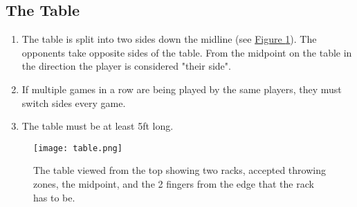 	\subsection{The Table}\label{ssec:Table}
        \begin{enumerate}[label=(\roman*)]
            \item \label{sssec:Table,sides} The table is split into two sides down the midline (see \hyperref[fig:table]{Figure \ref{fig:table}}).
			    The opponents take opposite sides of the table. 
			    From the midpoint on the table in the direction the player is considered "their side". 
            \item \label{sssec:Table,switch} If multiple games in a row are being played by the same players, they must switch sides every game. 
            \item \label{sssec:Table,length} The table must be at least 5ft long. 
        \end{enumerate}
        \begin{figure}[H]
            \centering
            \texttt{[image: table.png]}
            \caption{The table viewed from the top showing two racks, accepted throwing zones, the midpoint, and the 2 fingers from the edge that the rack has to be.}
            \label{fig:table}
        \end{figure}